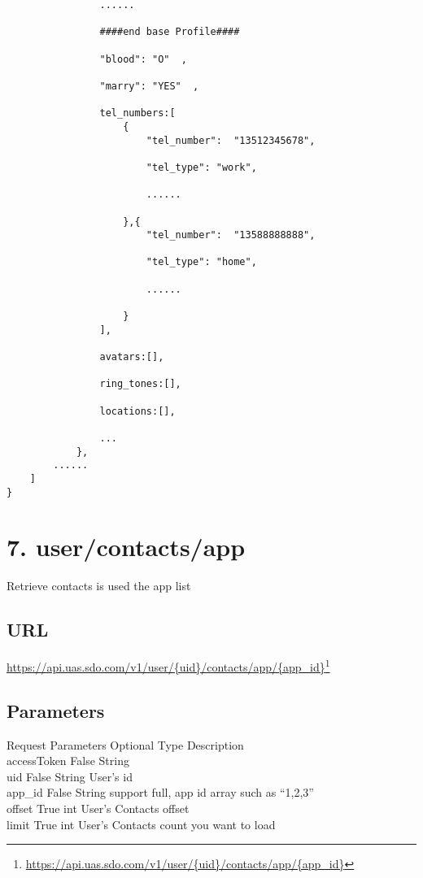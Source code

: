 \begin{verbatim}
                ......

                ####end base Profile####

                "blood": "O"  ,

                "marry": "YES"  ,

                tel_numbers:[
                    {
                        "tel_number":  "13512345678",

                        "tel_type": "work",

                        ......

                    },{
                        "tel_number":  "13588888888",

                        "tel_type": "home",

                        ......

                    }
                ],

                avatars:[],

                ring_tones:[],

                locations:[],

                ...
            },
        ......
    ]
}
\end{verbatim}


\chapter{7. user\slash contacts\slash app}
\label{usercontactsapp}

Retrieve contacts is used the app list

\section{URL}
\label{url}

\href{https://api.uas.sdo.com/v1/user/{uid}/contacts/app/{app_id}}{https:/\slash api.uas.sdo.com\slash v1\slash user\slash \{uid\}\slash contacts\slash app\slash \{app\_id\}}\footnote{\href{https://api.uas.sdo.com/v1/user/{uid}/contacts/app/{app_id}}{https:/\slash api.uas.sdo.com\slash v1\slash user\slash \{uid\}\slash contacts\slash app\slash \{app\_id\}}}

\section{Parameters}
\label{parameters}

\textbar{}Request Parameters \textbar{} Optional \textbar{} Type \textbar{} Description\\
\textbar{}accessToken \textbar{} False \textbar{} String\textbar{}\\
\textbar{}uid \textbar{} False \textbar{} String\textbar{} User's id\\
\textbar{}app\_id \textbar{} False \textbar{} String\textbar{} support full, app id array such as ``1,2,3''\\
offset \textbar{} True \textbar{} int \textbar{} User's Contacts offset\\
limit \textbar{} True \textbar{} int \textbar{} User's Contacts count you want to load 

